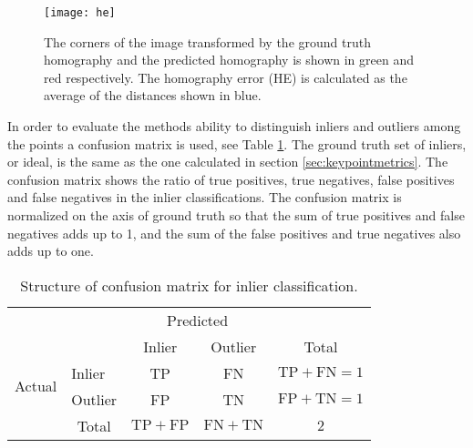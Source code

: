 \begin{figure}[H]
	\centering
	\texttt{[image: he]}
	\caption{The corners of the image transformed by the ground truth homography and the predicted homography is shown in green and red respectively. The homography error (HE) is calculated as the average of the distances shown in blue.}
	\label{fig:he}
\end{figure}

In order to evaluate the methods ability to distinguish inliers and outliers among the points a confusion matrix is used, see Table \ref{table:confusion}. The ground truth set of inliers, or ideal, is the same as the one calculated in section \ref{sec:keypointmetrics}. The confusion matrix shows the ratio of true positives, true negatives, false positives and false negatives in the inlier classifications. The confusion matrix is normalized on the axis of ground truth so that the sum of true positives and false negatives adds up to 1, and the sum of the false positives and true negatives also adds up to one.

\begin{table}[H]
	\centering
	\begin{tabular}{l|l|c|c|c}
		\multicolumn{2}{c}{}&\multicolumn{2}{c}{Predicted}&\\
		\cline{3-4}
		\multicolumn{2}{c|}{}&Inlier&Outlier&\multicolumn{1}{c}{Total}\\
		\cline{2-4}
		\multirow{2}{*}{Actual}& Inlier & TP & FN & $\mathrm{TP}+\mathrm{FN}=1$\\
		\cline{2-4}
		& Outlier & FP & TN & $\mathrm{FP}+\mathrm{TN}=1$\\
		\cline{2-4}
		\multicolumn{1}{c}{} & \multicolumn{1}{c}{Total} & \multicolumn{1}{c}{$\mathrm{TP}+\mathrm{FP}$} & \multicolumn{    1}{c}{$\mathrm{FN}+\mathrm{TN}$} & \multicolumn{1}{c}{$2$}\\
	\end{tabular}
	\caption{Structure of confusion matrix for inlier classification.}
	\label{table:confusion}
\end{table}
